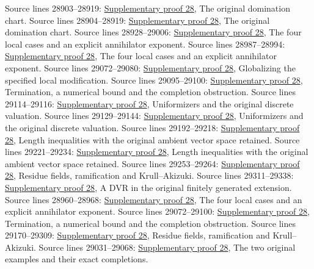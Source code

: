 \begin{AlgebraSourceRoutes}
 Source lines 28903--28919: \hyperlink{algebra_krull_akizuki_notes_20260928}{Supplementary proof 28}, The original domination chart.
 Source lines 28904--28919: \hyperlink{algebra_krull_akizuki_notes_20260928}{Supplementary proof 28}, The original domination chart.
 Source lines 28928--29006: \hyperlink{algebra_krull_akizuki_notes_20260928}{Supplementary proof 28}, The four local cases and an explicit annihilator exponent.
 Source lines 28987--28994: \hyperlink{algebra_krull_akizuki_notes_20260928}{Supplementary proof 28}, The four local cases and an explicit annihilator exponent.
 Source lines 29072--29080: \hyperlink{algebra_krull_akizuki_notes_20260928}{Supplementary proof 28}, Globalizing the specified local modification.
 Source lines 29095--29100: \hyperlink{algebra_krull_akizuki_notes_20260928}{Supplementary proof 28}, Termination, a numerical bound and the completion obstruction.
 Source lines 29114--29116: \hyperlink{algebra_krull_akizuki_notes_20260928}{Supplementary proof 28}, Uniformizers and the original discrete valuation.
 Source lines 29129--29144: \hyperlink{algebra_krull_akizuki_notes_20260928}{Supplementary proof 28}, Uniformizers and the original discrete valuation.
 Source lines 29192--29218: \hyperlink{algebra_krull_akizuki_notes_20260928}{Supplementary proof 28}, Length inequalities with the original ambient vector space retained.
 Source lines 29221--29234: \hyperlink{algebra_krull_akizuki_notes_20260928}{Supplementary proof 28}, Length inequalities with the original ambient vector space retained.
 Source lines 29253--29264: \hyperlink{algebra_krull_akizuki_notes_20260928}{Supplementary proof 28}, Residue fields, ramification and Krull–Akizuki.
 Source lines 29311--29338: \hyperlink{algebra_krull_akizuki_notes_20260928}{Supplementary proof 28}, A DVR in the original finitely generated extension.
 Source lines 28960--28968: \hyperlink{algebra_krull_akizuki_notes_20260928}{Supplementary proof 28}, The four local cases and an explicit annihilator exponent.
 Source lines 29072--29100: \hyperlink{algebra_krull_akizuki_notes_20260928}{Supplementary proof 28}, Termination, a numerical bound and the completion obstruction.
 Source lines 29170--29309: \hyperlink{algebra_krull_akizuki_notes_20260928}{Supplementary proof 28}, Residue fields, ramification and Krull–Akizuki.
 Source lines 29031--29068: \hyperlink{algebra_krull_akizuki_notes_20260928}{Supplementary proof 28}, The two original examples and their exact completions.
\end{AlgebraSourceRoutes}

